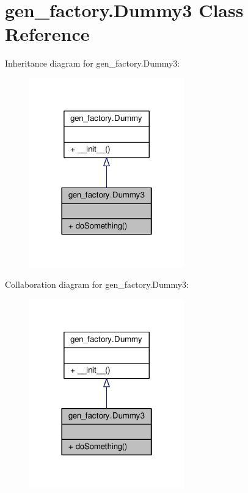 \hypertarget{classgen__factory_1_1_dummy3}{}\section{gen\+\_\+factory.\+Dummy3 Class Reference}
\label{classgen__factory_1_1_dummy3}


Inheritance diagram for gen\+\_\+factory.\+Dummy3\+:
\nopagebreak
\begin{figure}[H]
\begin{center}
\leavevmode
\includegraphics[width=190pt]{classgen__factory_1_1_dummy3__inherit__graph}
\end{center}
\end{figure}


Collaboration diagram for gen\+\_\+factory.\+Dummy3\+:
\nopagebreak
\begin{figure}[H]
\begin{center}
\leavevmode
\includegraphics[width=190pt]{classgen__factory_1_1_dummy3__coll__graph}
\end{center}
\end{figure}
